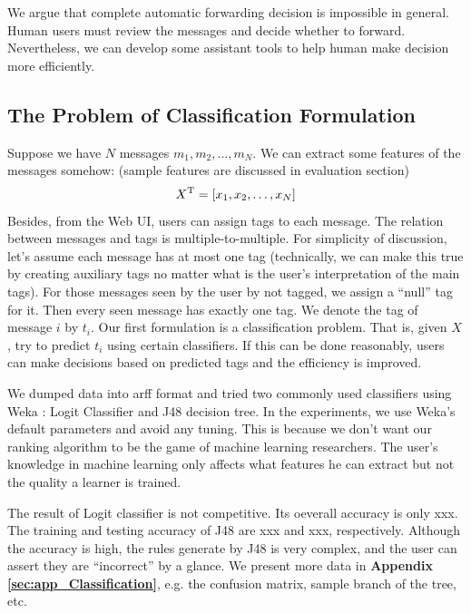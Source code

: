 \documentclass{sig-alternate}
\begin{document}
We argue that complete automatic forwarding decision is impossible in general. 
Human users must review the messages and decide whether to forward. 
Nevertheless, we can develop some assistant tools to 
help human make decision more efficiently. 


\subsection{The Problem of Classification Formulation}
\label{sec:The Problem of Classification}

Suppose we have $N$ messages $m_1, m_2, \ldots, m_N$. 
We can extract some features of the messages somehow:
(sample features are discussed in evaluation section)
\begin{equation}
	X^\mathrm{T} = [x_1, x_2, \ldots, x_N]
\end{equation}
Besides, from the Web UI, users can assign tags to each message. 
The relation between messages and tags is multiple-to-multiple. 
For simplicity of discussion, 
let's assume each message has at most one tag
(technically, we can make this true by creating auxiliary tags no 
matter what is the user's interpretation of the main tags). 
For those messages seen by the user by not tagged, 
we assign a ``null'' tag for it. 
Then every seen message has exactly one tag. 
We denote the tag of message $i$ by $t_i$. 
Our first formulation is a classification problem. 
That is, given $X$, try to predict $t_i$ using certain classifiers. 
If this can be done reasonably, users can make decisions based 
on predicted tags and the efficiency is improved. 

We dumped data into arff format and tried two 
commonly used classifiers using Weka \cite{weka}: 
Logit Classifier and J48 decision tree. 
In the experiments, we use Weka's default parameters and avoid any tuning. 
This is because we don't want our ranking algorithm to be the game of machine learning researchers. 
The user's knowledge in machine learning only affects what features he can extract 
but not the quality a learner is trained. 

The result of Logit classifier is not competitive.
Its oeverall accuracy is only xxx. 
The training and testing accuracy of J48 are xxx and xxx, respectively. 
Although the accuracy is high, 
the rules generate by J48 is very complex, 
and the user can assert they are ``incorrect'' by a glance. 
We present more data in \textbf{Appendix \ref{sec:app_Classification}}, 
e.g. the confusion matrix, sample branch of the tree, etc. 
\end{document}
